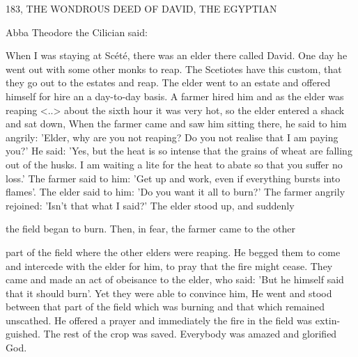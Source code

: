 183, THE WONDROUS DEED OF DAVID,
THE EGYPTIAN

Abba Theodore the Cilician said:

When I was staying at Scété, there was an elder there called David.
One day he went out with some other monks to reap. The Scetiotes
have this custom, that they go out to the estates and reap. The elder
went to an estate and offered himself for hire an a day-to-day basis.
A farmer hired him and as the elder was reaping <..> about the
sixth hour it was very hot, so the elder entered a shack and sat
down, When the farmer came and saw him sitting there, he said to
him angrily: 'Elder, why are you not reaping? Do you not realise
that I am paying you?' He said: 'Yes, but the heat is so intense that
the grains of wheat are falling out of the husks. I am waiting a lite
for the heat to abate so that you suffer no loss.' The farmer said to
him: 'Get up and work, even if everything bursts into flames'. The
elder said to him: 'Do you want it all to burn?' The farmer angrily
rejoined: 'Isn't that what I said?' The elder stood up, and suddenly

the field began to burn. Then, in fear, the farmer came to the other

part of the field where the other elders were reaping. He begged
them to come and intercede with the elder for him, to pray that the
fire might cease. They came and made an act of obeisance to the
elder, who said: 'But he himself said that it should burn'. Yet they
were able to convince him, He went and stood between that part of
the field which was burning and that which remained unscathed. He
offered a prayer and immediately the fire in the field was extin-
guished. The rest of the crop was saved. Everybody was amazed and
glorified God.

